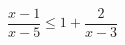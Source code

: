 \begin{ex}[type=inequality]
	\begin{condition}
		\( \dfrac{x-1}{x-5}\le1+\dfrac{2}{x-3} \)
	\end{condition}
	\answer{\( (-\infty;1]\cup(3;5) \)}
\end{ex}